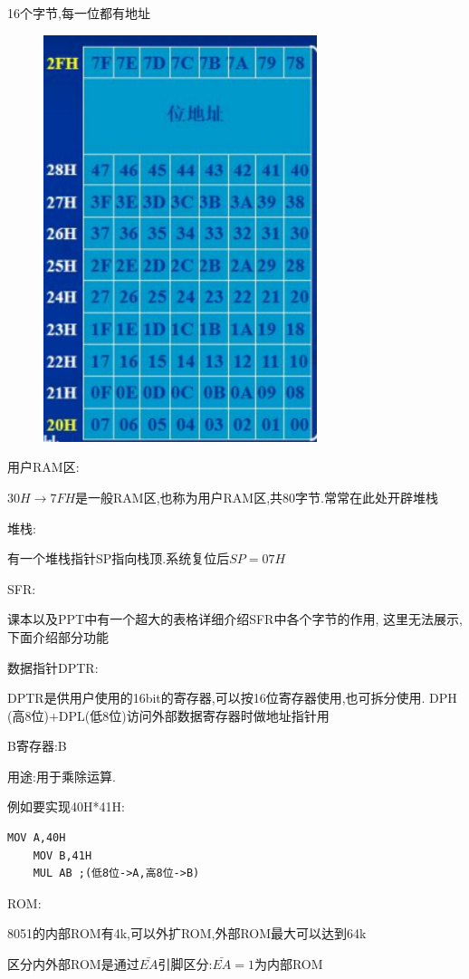 \documentclass[12pt,a4paper,oneside]{ctexart}
\begin{document}
16个字节,每一位都有地址
\begin{figure}[H]
    \centering
    \includegraphics[width=8cm]{photos/位寻址区.png}
\end{figure}

用户RAM区:

$30H\to 7FH$是一般RAM区,也称为用户RAM区,共80字节.常常在此处开辟堆栈

堆栈:

有一个堆栈指针SP指向栈顶.系统复位后$SP=07H$

SFR:

课本以及PPT中有一个超大的表格详细介绍SFR中各个字节的作用,
这里无法展示,下面介绍部分功能

数据指针DPTR:

DPTR是供用户使用的16bit的寄存器,可以按16位寄存器使用,也可拆分使用.
DPH (高8位)+DPL(低8位)访问外部数据寄存器时做地址指针用

B寄存器:B

用途:用于乘除运算.

例如要实现40H*41H:
\begin{lstlisting}[language=MCS51]
    MOV A,40H
    MOV B,41H
    MUL AB ;(低8位->A,高8位->B)
\end{lstlisting}

ROM:

8051的内部ROM有4k,可以外扩ROM,外部ROM最大可以达到64k

区分内外部ROM是通过$\bar{EA}$引脚区分:$\bar{EA}=1$为内部ROM
\end{document}
